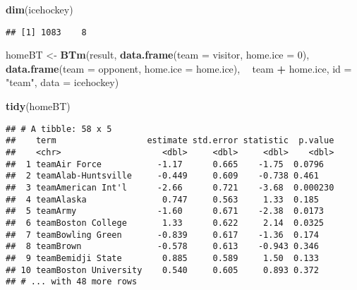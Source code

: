 \documentclass[]{article}
\newenvironment{Shaded}{\begin{snugshade}}{\end{snugshade}}
\newcommand{\DataTypeTok}[1]{\textcolor[rgb]{0.13,0.29,0.53}{#1}}
\newcommand{\DecValTok}[1]{\textcolor[rgb]{0.00,0.00,0.81}{#1}}
\newcommand{\KeywordTok}[1]{\textcolor[rgb]{0.13,0.29,0.53}{\textbf{#1}}}
\newcommand{\NormalTok}[1]{#1}
\newcommand{\OperatorTok}[1]{\textcolor[rgb]{0.81,0.36,0.00}{\textbf{#1}}}
\newcommand{\StringTok}[1]{\textcolor[rgb]{0.31,0.60,0.02}{#1}}
\begin{document}
\begin{Shaded}
\begin{Highlighting}[]
\KeywordTok{dim}\NormalTok{(icehockey)}
\end{Highlighting}
\end{Shaded}

\begin{verbatim}
## [1] 1083    8
\end{verbatim}

\begin{Shaded}
\begin{Highlighting}[]
\NormalTok{homeBT <-}\StringTok{ }\KeywordTok{BTm}\NormalTok{(result,}
               \KeywordTok{data.frame}\NormalTok{(}\DataTypeTok{team =}\NormalTok{ visitor, }\DataTypeTok{home.ice =} \DecValTok{0}\NormalTok{),}
               \KeywordTok{data.frame}\NormalTok{(}\DataTypeTok{team =}\NormalTok{ opponent, }\DataTypeTok{home.ice =}\NormalTok{ home.ice),}
               \OperatorTok{~}\StringTok{ }\NormalTok{team }\OperatorTok{+}\StringTok{ }\NormalTok{home.ice,}
               \DataTypeTok{id =} \StringTok{"team"}\NormalTok{, }\DataTypeTok{data =}\NormalTok{ icehockey)}

\KeywordTok{tidy}\NormalTok{(homeBT)}
\end{Highlighting}
\end{Shaded}

\begin{verbatim}
## # A tibble: 58 x 5
##    term                  estimate std.error statistic  p.value
##    <chr>                    <dbl>     <dbl>     <dbl>    <dbl>
##  1 teamAir Force           -1.17      0.665    -1.75  0.0796  
##  2 teamAlab-Huntsville     -0.449     0.609    -0.738 0.461   
##  3 teamAmerican Int'l      -2.66      0.721    -3.68  0.000230
##  4 teamAlaska               0.747     0.563     1.33  0.185   
##  5 teamArmy                -1.60      0.671    -2.38  0.0173  
##  6 teamBoston College       1.33      0.622     2.14  0.0325  
##  7 teamBowling Green       -0.839     0.617    -1.36  0.174   
##  8 teamBrown               -0.578     0.613    -0.943 0.346   
##  9 teamBemidji State        0.885     0.589     1.50  0.133   
## 10 teamBoston University    0.540     0.605     0.893 0.372   
## # ... with 48 more rows
\end{verbatim}

\begin{Shaded}
\end{Shaded}
\end{document}
